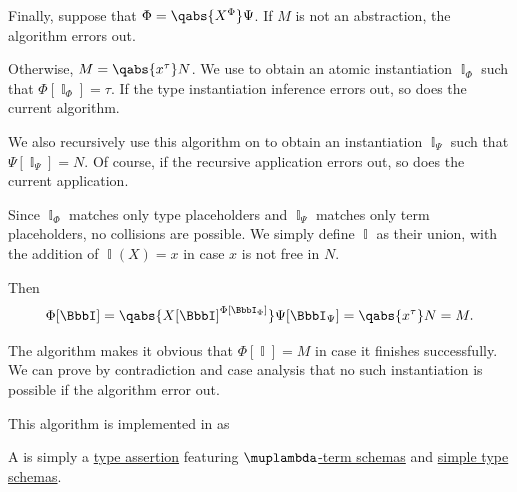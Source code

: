 \begin{algorithm}
\begin{thmenum}
     Finally, suppose that \( \Phi = \qabs {X^\Phi} \Psi \). If \( M \) is not an abstraction, the algorithm errors out.

    Otherwise, \( M = \qabs {x^\tau} N \). We use  to obtain an atomic instantiation \( \BbbI_\Phi \) such that \( \Phi[\BbbI_\Phi] = \tau \). If the type instantiation inference errors out, so does the current algorithm.

    We also recursively use this algorithm on to obtain an instantiation \( \BbbI_\Psi \) such that \( \Psi[\BbbI_\Psi] = N \). Of course, if the recursive application errors out, so does the current application.

    Since \( \BbbI_\Phi \) matches only type placeholders and \( \BbbI_\Psi \) matches only term placeholders, no collisions are possible. We simply define \( \BbbI \) as their union, with the addition of \( \BbbI(X) = x \) in case \( x \) is not free in \( N \).

    Then
    \begin{equation*}
      \Phi[\BbbI] = \qabs {{X[\BbbI]}^{\Phi[\BbbI_\Phi]}} \Psi[\BbbI_\Psi] = \qabs {x^\tau} N = M.
    \end{equation*}
  \end{thmenum}
\end{algorithm}
\begin{defproof}
  The algorithm makes it obvious that \( \Phi[\BbbI] = M \) in case it finishes successfully. We can prove by contradiction and case analysis that no such instantiation is possible if the algorithm error out.
\end{defproof}
\begin{comments}
  \item This algorithm is implemented in \cite{notebook:code} as
  \begin{CodeRefDisplay}
  \end{CodeRefDisplay}
\end{comments}

\begin{definition}\label{def:simple_type_assertion_schema}\mimprovised
  A  is simply a \hyperref[def:type_assertion]{type assertion} featuring \hyperref[def:lambda_term_schema]{\( \muplambda \)-term schemas} and \hyperref[def:simple_type_schema]{simple type schemas}.
\end{definition}

